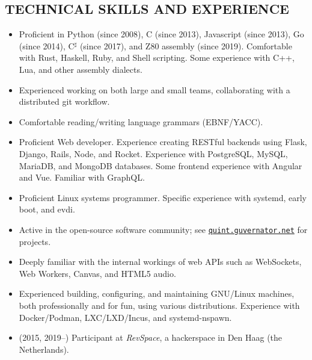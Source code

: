 \documentclass{res}     %
\begin{document}
\begin{resume}
\section{TECHNICAL SKILLS AND EXPERIENCE}
\vspace{5mm}
\begin{itemize}[leftmargin=5mm]
\item Proficient in
Python (since 2008),
C (since 2013),
Javascript (since 2013),
Go (since 2014),
C$^\sharp$ (since 2017),
and
Z80 assembly (since 2019).
Comfortable with
Rust,
Haskell,
Ruby,
and Shell scripting.
Some experience with
C++,
Lua,
and other assembly dialects.
\item Experienced working on both large and small teams, collaborating with a distributed git workflow.
\item Comfortable reading/writing language grammars (EBNF/YACC).
\item Proficient Web developer. Experience creating RESTful backends using Flask, Django, Rails, Node, and Rocket. Experience with PostgreSQL, MySQL, MariaDB, and MongoDB databases. Some frontend experience with Angular and Vue. Familiar with GraphQL.
\item Proficient Linux systems programmer. Specific experience with systemd, early boot, and evdi.
\item Active in the open-source software community; see \href{https://quint.guvernator.net}{\tt quint.guvernator.net} for projects.
\item Deeply familiar with the internal workings of web APIs such as WebSockets, Web Workers, Canvas, and HTML5 audio.
\item Experienced building, configuring, and maintaining GNU/Linux machines, both professionally and for fun, using various distributions. Experience with Docker/Podman, LXC/LXD/Incus, and systemd-nspawn.
\item (2015, 2019--) Participant at \emph{RevSpace}, a hackerspace in Den Haag (the Netherlands).

\end{itemize}
\end{resume}
\end{document}
